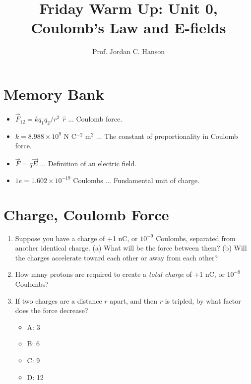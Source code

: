 \documentclass{article}
\begin{document}
\twocolumn

\title{Friday Warm Up: Unit 0, Coulomb's Law and E-fields}
\author{Prof. Jordan C. Hanson}

\maketitle

\section{Memory Bank}

\begin{itemize}
\item $\vec{F}_{12} = k q_1 q_2 / r^2 ~~\hat{r}$ ... Coulomb force.
\item $k = 8.988 \times 10^{9}$ N C$^{-2}$ m$^{2}$ ... The constant of proportionality in Coulomb force.
\item $\vec{F} = q\vec{E}$ ... Definition of an electric field.
\item $1e = 1.602 \times 10^{-19}$ Coulombs ... Fundamental unit of charge.
\end{itemize}

\section{Charge, Coulomb Force}

\begin{enumerate}
\item Suppose you have a charge of +1 nC, or $10^{-9}$ Coulombs, separated from another identical charge.  (a) What will be the force between them? (b) Will the charges accelerate toward each other or away from each other? \\ \vspace{4cm}
\item How many protons are required to create a \textit{total charge} of +1 nC, or $10^{-9}$ Coulombs? \\ \vspace{3cm}
\item If two charges are a distance $r$ apart, and then $r$ is tripled, by what factor does the force decrease?
\begin{itemize}
\item A: 3
\item B: 6
\item C: 9
\item D: 12
\end{itemize}
\end{enumerate}
\end{document}
